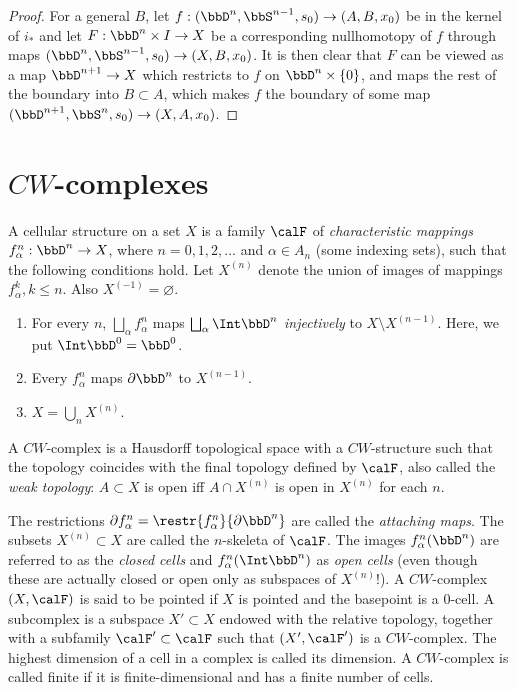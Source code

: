 \begin{proof}
    For a general $B$, let $f:(\bbD^{n},\bbS^{n-1},s_0)\to (A,B,x_0)$ be in the kernel of $i_\ast$ and let $F:\bbD^n\times I\to X$ be a corresponding nullhomotopy of $f$ through maps $(\bbD^n,\bbS^{n-1},s_0)\to (X,B,x_0)$. It is then clear that $F$ can be viewed as a map $\bbD^{n+1}\to X$ which restricts to $f$ on $\bbD^n\times \{0\}$, and maps the rest of the boundary into $B\subset A$, which makes $f$ the boundary of some map $(\bbD^{n+1},\bbS^n,s_0)\to (X,A,x_0)$.
\end{proof}



\section{\texorpdfstring{$CW$}{CW}-complexes}

\begin{defn}[$CW$-complex]
    A cellular structure on a set $X$ is a family $\calF $ of \textit{characteristic mappings} $f_\alpha^n:\bbD^n\to X$, where $n=0,1,2,\ldots$ and $\alpha\in A_n$ (some indexing sets), such that the following conditions hold. Let $X^{(n)}$ denote the union of images of mappings $f_\alpha^k, k\leq n$. Also $X^{(-1)}=\varnothing$.
    \begin{enumerate}
        \item For every $n$, $\bigsqcup_\alpha f_\alpha^n$ maps $\bigsqcup_\alpha \Int \bbD^n$ \emph{injectively} to $X\setminus X^{(n-1)}$. Here, we put $\Int \bbD^0=\bbD^0$.
        \item Every $f_\alpha^n$ maps $\partial \bbD^n$ to $X^{(n-1)}$.
        \item $X=\bigcup_n X^{(n)}$.
    \end{enumerate}
    
    A $CW$-complex is a Hausdorff topological space with a $CW$-structure such that the topology coincides with the final topology defined by $\calF $, also called the \emph{weak topology}: $A\subset X$ is open iff $A\cap X^{(n)}$ is open in $X^{(n)}$ for each $n$.

    The restrictions $\partial f_\alpha^n=\restr{f_\alpha^n}{\partial \bbD^n}$ are called the \textit{attaching maps}. The subsets $X^{(n)}\subset X$ are called the $n$-skeleta of $\calF $. The images $f_\alpha^n(\bbD^n)$ are referred to as the \textit{closed cells} and $f_\alpha^n(\Int  \bbD^n)$ as \textit{open cells} (even though these are actually closed or open only as subspaces of $X^{(n)}$!). A $CW$-complex $(X,\calF )$ is said to be pointed if $X$ is pointed and the basepoint is a $0$-cell. A subcomplex is a subspace $X'\subset X$ endowed with the relative topology, together with a subfamily $\calF '\subset\calF $ such that $(X',\calF ')$ is a $CW$-complex. The highest dimension of a cell in a complex is called its dimension. A $CW$-complex is called finite if it is finite-dimensional and has a finite number of cells.
\end{defn}

